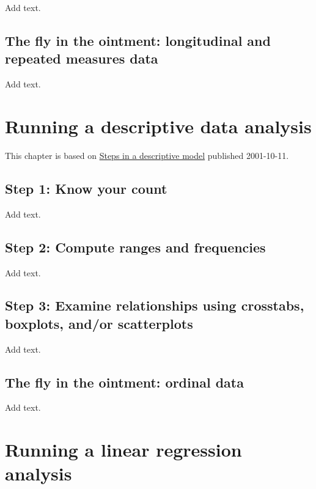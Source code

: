 \documentclass[
  letterpaper,
  DIV=11,
  numbers=noendperiod]{scrreprt}
\begin{document}
Add text.

\section{The fly in the ointment: longitudinal and repeated measures
data}\label{the-fly-in-the-ointment-longitudinal-and-repeated-measures-data}

Add text.


\chapter{Running a descriptive data
analysis}\label{running-a-descriptive-data-analysis}

This chapter is based on
\href{http://new.pmean.com/steps-in-descriptive-model/}{Steps in a
descriptive model} published 2001-10-11.

\section{Step 1: Know your count}\label{step-1-know-your-count}

Add text.

\section{Step 2: Compute ranges and
frequencies}\label{step-2-compute-ranges-and-frequencies}

Add text.

\section{Step 3: Examine relationships using crosstabs, boxplots, and/or
scatterplots}\label{step-3-examine-relationships-using-crosstabs-boxplots-andor-scatterplots}

Add text.

\section{The fly in the ointment: ordinal
data}\label{the-fly-in-the-ointment-ordinal-data}

Add text.


\chapter{Running a linear regression
analysis}\label{running-a-linear-regression-analysis}
\end{document}
